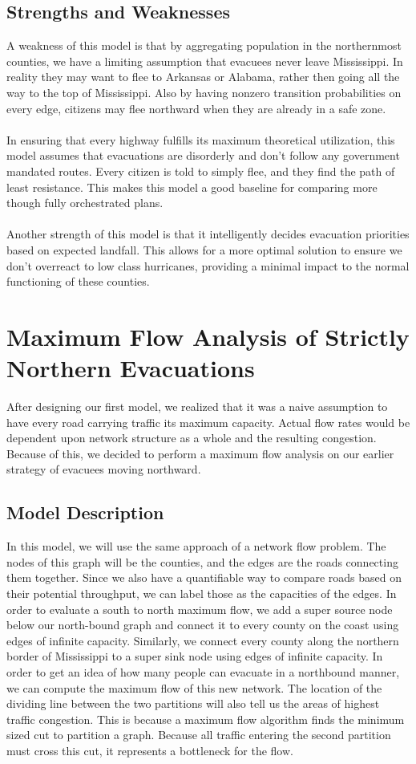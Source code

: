 \documentclass[titlepage]{article}
\begin{document}
  \subsection{Strengths and Weaknesses}
    A weakness of this model is that by aggregating population in the northernmost counties, we have a limiting assumption that evacuees never leave Mississippi. In reality they may want to flee to Arkansas or Alabama, rather then going all the way to the top of Mississippi. Also by having nonzero transition probabilities on every edge, citizens may flee northward when they are already in a safe zone.\\
    \\
    In ensuring that every highway fulfills its maximum theoretical utilization, this model assumes that evacuations are disorderly and don't follow any government mandated routes. Every citizen is told to simply flee, and they find the path of least resistance. This makes this model a good baseline for comparing more though fully orchestrated plans.\\
    \\
    Another strength of this model is that it intelligently decides evacuation priorities based on expected landfall. This allows for a more optimal solution to ensure we don't overreact to low class hurricanes, providing a minimal impact to the normal functioning of these counties.

\section{Maximum Flow Analysis of Strictly Northern Evacuations}
\label{sec:maxflow}
  After designing our first model, we realized that it was a naive assumption to have every road carrying traffic its maximum capacity. Actual flow rates would be dependent upon network structure as a whole and the resulting congestion. Because of this, we decided to perform a maximum flow analysis on our earlier strategy of evacuees moving northward.
  \subsection{Model Description}
    \par In this model, we will use the same approach of a network flow problem. The nodes of this graph will be the counties, and the edges are the roads connecting them together. Since we also have a quantifiable way to compare roads based on their potential throughput, we can label those as the capacities of the edges. In order to evaluate a south to north maximum flow, we add a super source node below our north-bound graph and connect it to every county on the coast using edges of infinite capacity. Similarly, we connect every county along the northern border of Mississippi to a super sink node using edges of infinite capacity. In order to get an idea of how many people can evacuate in a northbound manner, we can compute the maximum flow of this new network. The location of the dividing line between the two partitions will also tell us the areas of highest traffic congestion. This is because a maximum flow algorithm finds the minimum sized cut to partition a graph. Because all traffic entering the second partition must cross this cut, it represents a bottleneck for the flow.
\end{document}
